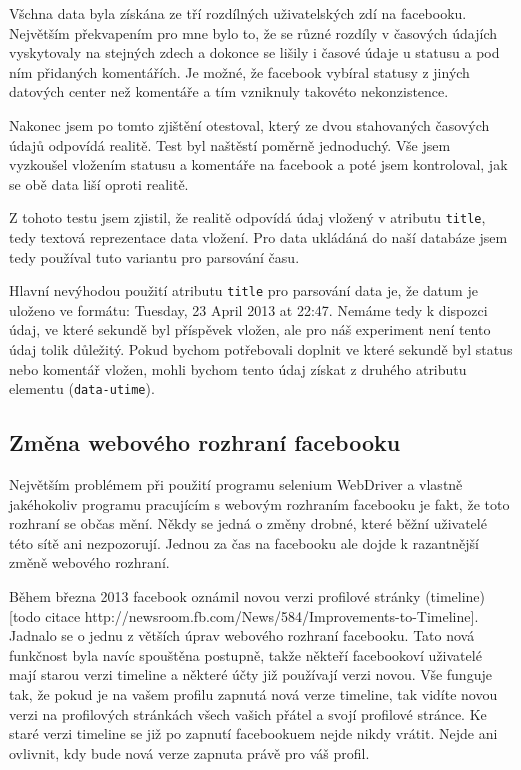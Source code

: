 \documentclass[thesis=M,czech]{FITthesis}[2013/05/10]
\begin{document}
Všchna data byla získána ze tří rozdílných uživatelských zdí na facebooku. Největším překvapením pro mne bylo to, že se různé rozdíly v časových údajích vyskytovaly na stejných zdech a dokonce se lišily i časové údaje u statusu a pod ním přidaných komentářích.  Je možné, že facebook vybíral statusy z jiných datových center než komentáře a tím vzniknuly takovéto nekonzistence.

Nakonec jsem po tomto zjištění otestoval, který ze dvou stahovaných časových údajů odpovídá realitě. Test byl naštěstí poměrně jednoduchý. Vše jsem vyzkoušel vložením statusu a komentáře na facebook a poté jsem kontroloval, jak se obě data liší oproti realitě. 

Z tohoto testu jsem zjistil, že realitě odpovídá údaj vložený v atributu \verb|title|, tedy textová reprezentace data vložení. Pro data ukládáná do naší databáze jsem tedy používal tuto variantu pro parsování času.

Hlavní nevýhodou použití atributu \verb|title| pro parsování data je, že datum je uloženo ve formátu: Tuesday, 23 April 2013 at 22:47. Nemáme tedy k dispozci údaj, ve které sekundě byl příspěvek vložen, ale pro náš experiment není tento údaj tolik důležitý. Pokud bychom potřebovali doplnit ve které sekundě byl status nebo komentář vložen, mohli bychom tento údaj získat z druhého atributu elementu (\verb|data-utime|). 

\subsection{Změna webového rozhraní facebooku}

Největším problémem při použití programu selenium WebDriver a vlastně jakéhokoliv programu pracujícím s webovým rozhraním facebooku je fakt, že toto rozhraní se občas mění. Někdy se jedná o změny drobné, které běžní uživatelé této sítě ani nezpozorují. Jednou za čas na facebooku ale dojde k razantnější změně webového rozhraní.

Během března 2013 facebook oznámil novou verzi profilové stránky (timeline) [todo citace http://newsroom.fb.com/News/584/Improvements-to-Timeline]. Jadnalo se o jednu z větších úprav webového rozhraní facebooku. Tato nová funkčnost byla navíc spouštěna postupně, takže někteří facebookoví uživatelé mají starou verzi timeline a některé účty již používají verzi novou. Vše funguje tak, že pokud je na vašem profilu zapnutá nová verze timeline, tak vidíte novou verzi na profilových stránkách všech vašich přátel a svojí profilové stránce. Ke staré verzi timeline se již po zapnutí facebookuem nejde nikdy vrátit. Nejde ani ovlivnit, kdy bude nová verze zapnuta právě pro váš profil.
\end{document}
